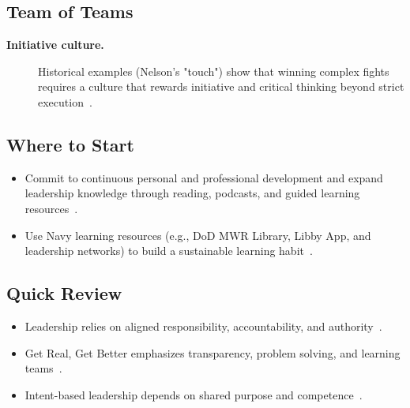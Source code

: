 \documentclass[../main.tex]{subfiles}
\begin{document}
\subsection{Team of Teams}
\begin{description}
  \item[\textbf{Initiative culture.}] Historical examples (Nelson's "touch") show that winning complex fights requires a culture that rewards initiative and critical thinking beyond strict execution~\autocite{edo-5-1-6-leading-people-2025}.
\end{description}

\subsection{Where to Start}
\begin{itemize}
  \item Commit to continuous personal and professional development and expand leadership knowledge through reading, podcasts, and guided learning resources~\autocite{edo-5-1-6-leading-people-2025}.
  \item Use Navy learning resources (e.g., DoD MWR Library, Libby App, and leadership networks) to build a sustainable learning habit~\autocite{edo-5-1-6-leading-people-2025}.
\end{itemize}

\subsection{Quick Review}
\begin{itemize}
  \item Leadership relies on aligned responsibility, accountability, and authority~\autocite{edo-5-1-6-leading-people-2025}.
  \item Get Real, Get Better emphasizes transparency, problem solving, and learning teams~\autocite{edo-5-1-6-leading-people-2025,Navy-NLDF-GRGB-Leaders-Toolkit-2026}.
  \item Intent-based leadership depends on shared purpose and competence~\autocite{edo-5-1-6-leading-people-2025}.
\end{itemize}

\end{document}
